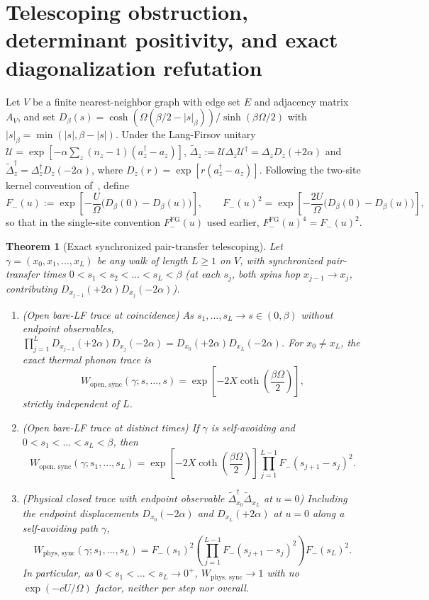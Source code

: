 \documentclass[11pt]{article}
\newtheorem{theorem}{Theorem}[section]
\theoremstyle{definition}
\theoremstyle{remark}
\newcommand{\Dop}{\Delta}
\begin{document}
\section{Telescoping obstruction, determinant positivity, and exact diagonalization refutation}
\label{sec:telescope}

Let $V$ be a finite nearest-neighbor graph with edge set $E$ and adjacency
matrix $A_V$, and set $D_\beta(s) = \cosh(\Omega(\beta/2 - |s|_\beta))/\sinh(\beta\Omega/2)$
with $|s|_\beta = \min(|s|, \beta - |s|)$. Under the Lang-Firsov unitary
$\mathcal{U} = \exp[-\alpha \sum_z (n_z - 1)(a_z^\dagger - a_z)]$,
$\widetilde{\Dop}_z := \mathcal{U}\Dop_z\mathcal{U}^\dagger = \Dop_z D_z(+2\alpha)$
and $\widetilde{\Dop}_z^\dagger = \Dop_z^\dagger D_z(-2\alpha)$, where
$D_z(r) = \exp[r(a_z^\dagger - a_z)]$. Following the two-site kernel convention
of~\cite{barriers3}, define
\[
F_-(u) := \exp\!\left[-\frac{U}{\Omega}\bigl(D_\beta(0) - D_\beta(u)\bigr)\right],
\qquad
F_-(u)^2 = \exp\!\left[-\frac{2U}{\Omega}\bigl(D_\beta(0) - D_\beta(u)\bigr)\right],
\]
so that in the single-site convention $F_-^{\mathrm{FG}}(u)$ used earlier,
$F_-^{\mathrm{FG}}(u)^4 = F_-(u)^2$.

\begin{theorem}[Exact synchronized pair-transfer telescoping]
\label{thm:tel-telescope}
Let $\gamma = (x_0, x_1, \dots, x_L)$ be any walk of length $L \ge 1$ on $V$,
with synchronized pair-transfer times $0 < s_1 < s_2 < \dots < s_L < \beta$
(at each $s_j$, both spins hop $x_{j-1} \to x_j$, contributing
$D_{x_{j-1}}(+2\alpha) D_{x_j}(-2\alpha)$).
\begin{enumerate}[leftmargin=1.5em]
\item \emph{(Open bare-LF trace at coincidence)} As $s_1, \dots, s_L \to s \in (0,\beta)$
without endpoint observables, $\prod_{j=1}^L D_{x_{j-1}}(+2\alpha) D_{x_j}(-2\alpha) = D_{x_0}(+2\alpha) D_{x_L}(-2\alpha)$.
For $x_0 \neq x_L$, the exact thermal phonon trace is
\[
W_{\mathrm{open},\,\mathrm{sync}}(\gamma; s,\dots,s)
= \exp\!\left[-2 X \coth\!\left(\frac{\beta\Omega}{2}\right)\right],
\]
strictly independent of $L$.
\item \emph{(Open bare-LF trace at distinct times)} If $\gamma$ is
self-avoiding and $0 < s_1 < \dots < s_L < \beta$, then
\[
W_{\mathrm{open},\,\mathrm{sync}}(\gamma; s_1, \dots, s_L)
= \exp\!\left[-2 X \coth\!\left(\frac{\beta\Omega}{2}\right)\right]
  \prod_{j=1}^{L-1} F_-(s_{j+1} - s_j)^2.
\]
\item \emph{(Physical closed trace with endpoint observable $\widetilde{\Dop}_{x_0}^\dagger \widetilde{\Dop}_{x_L}$ at $u=0$)}
Including the endpoint displacements $D_{x_0}(-2\alpha)$ and $D_{x_L}(+2\alpha)$
at $u=0$ along a self-avoiding path $\gamma$,
\[
W_{\mathrm{phys},\,\mathrm{sync}}(\gamma; s_1, \dots, s_L)
= F_-(s_1)^2 \left(\prod_{j=1}^{L-1} F_-(s_{j+1} - s_j)^2\right) F_-(s_L)^2.
\]
In particular, as $0 < s_1 < \dots < s_L \to 0^+$, $W_{\mathrm{phys},\,\mathrm{sync}} \to 1$
with no $\exp(-c U/\Omega)$ factor, neither per step nor overall.
\end{enumerate}
\end{theorem}
\end{document}
